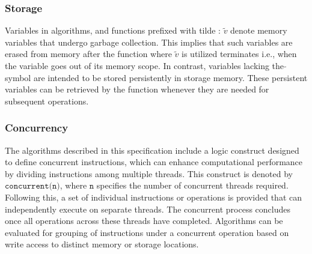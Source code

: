 \documentclass[../alan-handbook.tex]{subfiles}
\begin{document}
\subsubsection{Storage} \label{Storage}

Variables in algorithms, and functions prefixed with tilde : $\tilde{v}$ denote memory variables that undergo garbage collection. This implies that such variables are erased from memory after the function where $\tilde{v}$ is utilized terminates i.e., when the variable goes out of its memory scope. In contrast, variables lacking the $\tilde{}$ symbol are intended to be stored persistently in storage memory. These persistent variables can be retrieved by the function whenever they are needed for subsequent operations.

\subsubsection{Concurrency} \label{Concurrency}

The algorithms described in this specification include a logic construct designed to define concurrent instructions, which can enhance computational performance by dividing instructions among multiple threads. This construct is denoted by $\texttt{concurrent(n)}$, where $\texttt{n}$ specifies the number of concurrent threads required. Following this, a set of individual instructions or operations is provided that can independently execute on separate threads. The concurrent process concludes once all operations across these threads have completed. Algorithms can be evaluated for grouping of instructions under a concurrent operation based on write access to distinct memory or storage locations.
\end{document}
